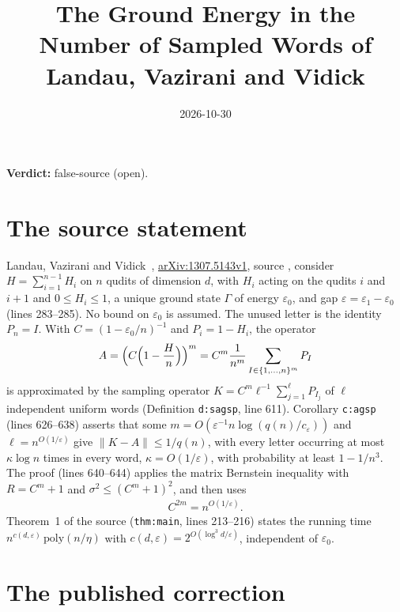 \documentclass{article}
\title{The Ground Energy in the Number of Sampled Words of Landau, Vazirani and Vidick}
\author{}
\date{2026-10-30}
\providecommand{\gapnote}[2]{\par\noindent\textbf{Verdict:} #1 (#2).\par}
\begin{document}
\maketitle
\gapnote{false-source}{open}

\section{The source statement}

Landau, Vazirani and Vidick~\cite{Landau2015Polynomial},
\href{https://arxiv.org/abs/1307.5143v1}{arXiv:1307.5143v1}, source
, consider $H=\sum_{i=1}^{n-1}H_i$ on $n$ qudits of dimension
$d$, with $H_i$ acting on the qudits $i$ and $i+1$ and $0\le H_i\le1$, a unique
ground state $\Gamma$ of energy $\varepsilon_0$, and gap
$\varepsilon=\varepsilon_1-\varepsilon_0$ (lines 283--285). No bound on
$\varepsilon_0$ is assumed. The unused letter is the identity $P_n=I$. With $C=(1-\varepsilon_0/n)^{-1}$ and $P_i=1-H_i$,
the operator
\begin{align*}
    A=\Bigl(C\Bigl(1-\frac Hn\Bigr)\Bigr)^m
    =C^m\frac1{n^m}\sum_{I\in\{1,\ldots,n\}^m}P_I
\end{align*}
is approximated by the sampling operator
$K=C^m\ell^{-1}\sum_{j=1}^\ell P_{I_j}$ of $\ell$ independent uniform words
(Definition \texttt{d:sagsp}, line 611). Corollary \texttt{c:agsp} (lines
626--638) asserts that some $m=O(\varepsilon^{-1}n\log(q(n)/c_\varepsilon))$
and $\ell=n^{O(1/\varepsilon)}$ give $\|K-A\|\le1/q(n)$, with every letter
occurring at most $\kappa\log n$ times in every word, $\kappa=O(1/\varepsilon)$,
with probability at least $1-1/n^3$. The proof (lines 640--644) applies the
matrix Bernstein inequality with $R=C^m+1$ and $\sigma^2\le(C^m+1)^2$, and then
uses
\begin{align}
    C^{2m}=n^{O(1/\varepsilon)}.
    \label{eq:printed}
\end{align}
Theorem~1 of the source (\texttt{thm:main}, lines 213--216) states the running time
$n^{c(d,\varepsilon)}\,\mathrm{poly}(n/\eta)$ with
$c(d,\varepsilon)=2^{O(\log^3d/\varepsilon)}$, independent of $\varepsilon_0$.

\section{The published correction}
\end{document}
